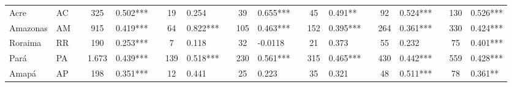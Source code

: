\documentclass[a4paper, 12pt]{article}
\begin{document}
\begin{landscape}
\begin{table}[H]
\begin{adjustbox}{max height=\textheight,max width=\textwidth}
\begin{tabular}{p{15.28em}lclllllllllllllllll}
    Acre  & \multicolumn{1}{p{4.445em}}{AC} &       & \multicolumn{1}{c}{325} & \multicolumn{1}{p{7.39em}}{0.502***} &       & \multicolumn{1}{c}{19} & \multicolumn{1}{p{6.055em}}{0.254} &       & \multicolumn{1}{c}{39} & \multicolumn{1}{p{6.055em}}{0.655***} &       & \multicolumn{1}{c}{45} & \multicolumn{1}{p{6.055em}}{0.491**} &       & \multicolumn{1}{c}{92} & \multicolumn{1}{p{6.055em}}{0.524***} &       & \multicolumn{1}{c}{130} & \multicolumn{1}{p{6.055em}}{0.526***} \\
    Amazonas & \multicolumn{1}{p{4.445em}}{AM} &       & \multicolumn{1}{c}{915} & \multicolumn{1}{p{7.39em}}{0.419***} &       & \multicolumn{1}{c}{64} & \multicolumn{1}{p{6.055em}}{0.822***} &       & \multicolumn{1}{c}{105} & \multicolumn{1}{p{6.055em}}{0.463***} &       & \multicolumn{1}{c}{152} & \multicolumn{1}{p{6.055em}}{0.395***} &       & \multicolumn{1}{c}{264} & \multicolumn{1}{p{6.055em}}{0.361***} &       & \multicolumn{1}{c}{330} & \multicolumn{1}{p{6.055em}}{0.424***} \\
    Roraima & \multicolumn{1}{p{4.445em}}{RR} &       & \multicolumn{1}{c}{190} & \multicolumn{1}{p{7.39em}}{0.253***} &       & \multicolumn{1}{c}{7} & \multicolumn{1}{p{6.055em}}{0.118} &       & \multicolumn{1}{c}{32} & \multicolumn{1}{p{6.055em}}{-0.0118} &       & \multicolumn{1}{c}{21} & \multicolumn{1}{p{6.055em}}{0.373} &       & \multicolumn{1}{c}{55} & \multicolumn{1}{p{6.055em}}{0.232} &       & \multicolumn{1}{c}{75} & \multicolumn{1}{p{6.055em}}{0.401***} \\
    Pará  & \multicolumn{1}{p{4.445em}}{PA} &       & \multicolumn{1}{c}{1.673} & \multicolumn{1}{p{7.39em}}{0.439***} &       & \multicolumn{1}{c}{139} & \multicolumn{1}{p{6.055em}}{0.518***} &       & \multicolumn{1}{c}{230} & \multicolumn{1}{p{6.055em}}{0.561***} &       & \multicolumn{1}{c}{315} & \multicolumn{1}{p{6.055em}}{0.465***} &       & \multicolumn{1}{c}{430} & \multicolumn{1}{p{6.055em}}{0.442***} &       & \multicolumn{1}{c}{559} & \multicolumn{1}{p{6.055em}}{0.428***} \\
    Amapá & \multicolumn{1}{p{4.445em}}{AP} &       & \multicolumn{1}{c}{198} & \multicolumn{1}{p{7.39em}}{0.351***} &       & \multicolumn{1}{c}{12} & \multicolumn{1}{p{6.055em}}{0.441} &       & \multicolumn{1}{c}{25} & \multicolumn{1}{p{6.055em}}{0.223} &       & \multicolumn{1}{c}{35} & \multicolumn{1}{p{6.055em}}{0.321} &       & \multicolumn{1}{c}{48} & \multicolumn{1}{p{6.055em}}{0.511***} &       & \multicolumn{1}{c}{78} & \multicolumn{1}{p{6.055em}}{0.361**} \\

\end{tabular}
\end{adjustbox}
\end{table}
\end{landscape}
\end{document}

